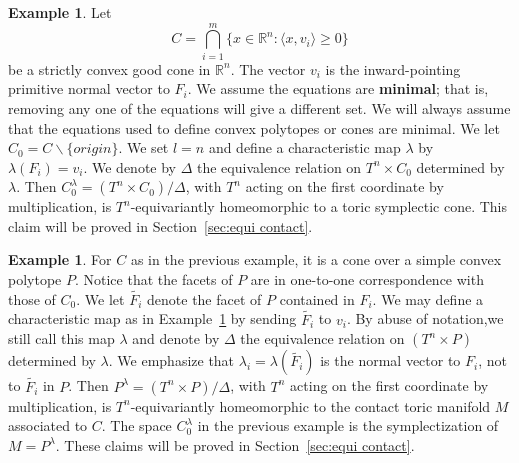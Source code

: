 \documentclass[12pt]{amsart}
\theoremstyle{definition}
\newtheorem{example}[theorem]{Example}
\numberwithin{equation}{section}
\begin{document}
\begin{example}\label{ex:symplectic cone combina}
  Let
  \begin{equation}
  C= \bigcap_{i=1}^{m}\{x\in {{\mathbb{R}}}^n: \langle x, v_{i}\rangle \geq 0\}
\end{equation}
be a strictly convex good cone in ${{\mathbb{R}}}^n$. The vector $v_{i}$ is the
inward-pointing primitive normal vector to $F_{i}$. We assume the
equations are {\bf minimal}; that is, removing any one of the
equations will give a different set. We will always assume that the
equations used to define convex polytopes or cones are minimal. We
let $C_{0}=C\backslash
 \{origin\}$. We set $l=n$ and define a characteristic map $\lambda$ by $\lambda(F_{i})=v_{i}$.
 We denote by $\Delta$ the equivalence relation on $T^n\times C_{0}$ determined
 by $\lambda$.
 Then $C_{0}^{\lambda}= (T^n\times C_{0})/\Delta$, with $T^n$ acting on the first coordinate by multiplication, is
$T^n$-equivariantly homeomorphic to a toric symplectic cone. This
claim will be proved in Section~\ref{sec:equi contact}.
\end{example}

\begin{example}\label{ex:contact combina}
 For $C$ as in the previous example, it is a cone over a simple convex polytope $P$.
Notice that the facets of $P$ are in one-to-one correspondence with
those of $C_{0}$. We let $\tilde{F_{i}}$ denote the facet of $P$
contained in $F_{i}$. We may define a characteristic map as in
Example~\ref{ex:symplectic cone combina} by sending $\tilde{F_{i}}$
to $v_{i}$. By abuse of notation,we still call this map $\lambda$
and denote by $\Delta$ the equivalence relation on $(T^n\times P)$
determined by $\lambda$. We emphasize that $\lambda_{i}=
\lambda(\tilde{F_{i}})$ is the normal vector to $F_{i}$, not to
$\tilde{F_{i}}$ in $P$.  Then $P^{\lambda}= (T^n\times P)/\Delta$,
with $T^n$ acting on the first coordinate by multiplication, is
$T^n$-equivariantly homeomorphic to the contact toric manifold $M$
associated to $C$. The space $C_{0}^{\lambda}$ in the previous
example is the symplectization of $M=P^{\lambda}$. These claims will
be proved in Section~\ref{sec:equi contact}.
\end{example}
\end{document}
